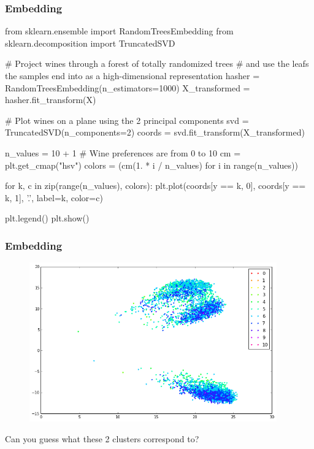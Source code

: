 \documentclass{beamer}
\begin{document}
\begin{frame}[fragile]
  \frametitle{Embedding}

{\scriptsize
\begin{pythoncode}
from sklearn.ensemble import RandomTreesEmbedding
from sklearn.decomposition import TruncatedSVD

# Project wines through a forest of totally randomized trees
# and use the leafs the samples end into as a high-dimensional representation
hasher = RandomTreesEmbedding(n_estimators=1000)
X_transformed = hasher.fit_transform(X)

# Plot wines on a plane using the 2 principal components
svd = TruncatedSVD(n_components=2)
coords = svd.fit_transform(X_transformed)

n_values = 10 + 1  # Wine preferences are from 0 to 10
cm = plt.get_cmap("hsv")
colors =  (cm(1. * i / n_values) for i in range(n_values))

for k, c in zip(range(n_values), colors):
    plt.plot(coords[y == k, 0], coords[y == k, 1], '.', label=k, color=c)

plt.legend()
plt.show()
\end{pythoncode}
}

\end{frame}


\begin{frame}[fragile]
  \frametitle{Embedding}

    \begin{figure}
       \centering
       \includegraphics[width=0.95\textwidth]{./figures/embedding.png}
    \end{figure}

    \begin{center}
        Can you guess what these 2 clusters correspond to?
    \end{center}

\end{frame}
\end{document}

